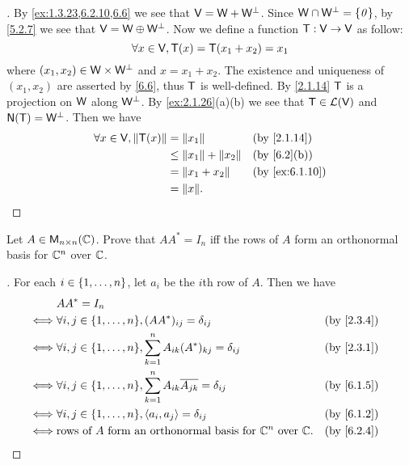 \begin{proof}[]
  By \cref{ex:1.3.23,6.2.10,6.6} we see that \(\mathsf{V} = \mathsf{W} + \mathsf{W}^{\perp}\).
  Since \(\mathsf{W} \cap \mathsf{W}^{\perp} = \left\lbrace\mathit{0}\right\rbrace\), by \cref{5.2.7} we see that \(\mathsf{V} = \mathsf{W} \oplus \mathsf{W}^{\perp}\).
  Now we define a function \(\mathsf{T} : \mathsf{V} \to \mathsf{V}\) as follow:
  \[
    \forall x \in \mathsf{V}, \mathsf{T}(x) = \mathsf{T}(x_1 + x_2) = x_1
  \]
  where \((x_1, x_2) \in \mathsf{W} \times \mathsf{W}^{\perp}\) and \(x = x_1 + x_2\).
  The existence and uniqueness of \((x_1, x_2)\) are asserted by \cref{6.6}, thus \(\mathsf{T}\) is well-defined.
  By \cref{2.1.14} \(\mathsf{T}\) is a projection on \(\mathsf{W}\) along \(\mathsf{W}^{\perp}\).
  By \cref{ex:2.1.26}(a)(b) we see that \(\mathsf{T} \in \mathcal{L}(\mathsf{V})\) and \(\ns{\T} = \W^{\perp}\).
  Then we have
  \begin{align*}
    \forall x \in \V, \norm{\T(x)} & = \norm{x_1}                 &  & \by{2.1.14}    \\
                                   & \leq \norm{x_1} + \norm{x_2} &  & \by{6.2}[b]    \\
                                   & = \norm{x_1 + x_2}           &  & \by{ex:6.1.10} \\
                                   & = \norm{x}.
  \end{align*}
\end{proof}

\begin{ex}\label{ex:6.2.11}
  Let \(A \in \ms[n][n][\C]\).
  Prove that \(AA^* = I_n\) iff the rows of \(A\) form an orthonormal basis for \(\mathbb{C}^n\) over \(\mathbb{C}\).
\end{ex}

\begin{proof}[]
  For each \(i \in \left\lbrace1, \dots, n\right\rbrace\), let \(a_i\) be the \(i\)th row of \(A\).
  Then we have
  \begin{align*}
         & AA^* = I_n                                                                                               \\
    \iff & \forall i, j \in \set{1, \dots, n}, (AA^*)_{i j} = \delta_{i j}                          &  & \by{2.3.4} \\
    \iff & \forall i, j \in \set{1, \dots, n}, \sum_{k = 1}^n A_{i k} (A^*)_{k j} = \delta_{i j}    &  & \by{2.3.1} \\
    \iff & \forall i, j \in \set{1, \dots, n}, \sum_{k = 1}^n A_{i k} \conj{A_{j k}} = \delta_{i j} &  & \by{6.1.5} \\
    \iff & \forall i, j \in \set{1, \dots, n}, \inn{a_i, a_j} = \delta_{i j}                        &  & \by{6.1.2} \\
    \iff & \text{rows of } A \text{ form an orthonormal basis for } \C^n \text{ over } \C.          &  & \by{6.2.4}
  \end{align*}
\end{proof}

